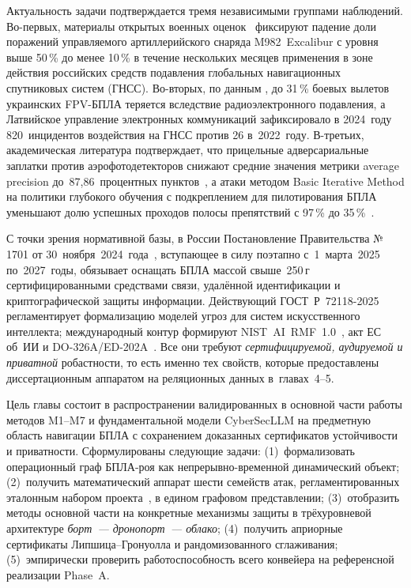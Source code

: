 Актуальность задачи подтверждается тремя независимыми группами
наблюдений. Во-первых, материалы открытых военных
оценок~\cite{wapo_excalibur_2024} фиксируют падение доли поражений
управляемого артиллерийского снаряда M982~Excalibur с уровня выше
50\,\% до менее 10\,\% в течение нескольких месяцев применения в зоне
действия российских средств подавления глобальных навигационных
спутниковых систем (ГНСС). Во-вторых, по данным
\cite{inside_uas_2025}, до 31\,\% боевых вылетов украинских FPV-БПЛА
теряется вследствие радиоэлектронного подавления, а Латвийское
управление электронных коммуникаций зафиксировало в 2024~году
820~инцидентов воздействия на ГНСС против 26 в~2022~году. В-третьих,
академическая литература подтверждает, что прицельные адверсариальные
заплатки против аэрофотодетекторов снижают средние значения метрики
average precision до~87{,}86~процентных пунктов~\cite{lian_2022}, а
атаки методом Basic Iterative Method на политики глубокого обучения с
подкреплением для пилотирования БПЛА уменьшают долю успешных проходов
полосы препятствий с 97\,\% до 35\,\%~\cite{hickling_2023}.

С точки зрения нормативной базы, в России Постановление Правительства
№\,1701 от 30~ноября~2024~года~\cite{decree_1701}, вступающее в силу
поэтапно с~1~марта~2025 по~2027~годы, обязывает оснащать БПЛА массой
свыше~250\,г сертифицированными средствами связи, удалённой
идентификации и криптографической защиты информации. Действующий
\mbox{ГОСТ~Р~72118-2025} регламентирует формализацию моделей угроз для
систем искусственного интеллекта; международный контур формируют
\mbox{NIST~AI~RMF~1.0}~\cite{nist_rmf}, акт ЕС об~ИИ и
\mbox{DO-326A/ED-202A}~\cite{do_326a}. Все они требуют
\emph{сертифицируемой, аудируемой и приватной} робастности, то есть
именно тех свойств, которые предоставлены диссертационным аппаратом на
реляционных данных в~главах~4--5.

Цель главы состоит в распространении валидированных в основной части
работы методов \textsf{M1}--\textsf{M7} и фундаментальной модели
\textsf{CyberSecLLM} на предметную область навигации БПЛА с сохранением
доказанных сертификатов устойчивости и приватности. Сформулированы
следующие задачи: (1)~формализовать операционный граф БПЛА-роя как
непрерывно-временной динамический объект; (2)~получить математический
аппарат шести семейств атак, регламентированных эталонным набором
проекта~\cite{uav_proposal_2026}, в едином графовом представлении;
(3)~отобразить методы основной части на конкретные механизмы защиты в
трёхуровневой архитектуре \emph{борт~--- дронопорт~--- облако};
(4)~получить априорные сертификаты Липшица--Гронуолла и рандомизованного
сглаживания; (5)~эмпирически проверить работоспособность всего конвейера
на референсной реализации Phase~A.

